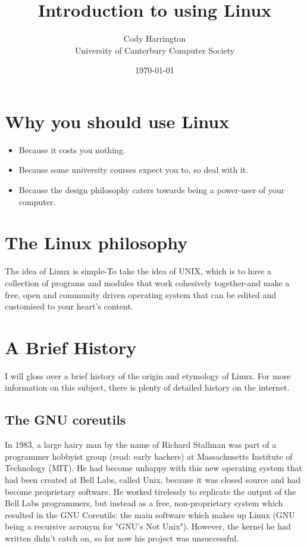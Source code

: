 \documentclass{article}
\begin{document}
\title{Introduction to using Linux}
\author{Cody Harrington\\University of Canterbury Computer Society}
\date{\today}
\maketitle

\section{Why you should use Linux}
\begin{itemize}
\item Because it costs you nothing.
\item Because some university courses expect you to, so deal with it.
\item Because the design philosophy caters towards being a power-user of your computer.
\end{itemize}

\section{The Linux philosophy}
The idea of Linux is simple-To take the idea of UNIX, which is to have a collection of programs and modules that work cohesively together-and make a free, open and community driven operating system that can be edited and customised to your heart's content.

\section{A Brief History}

I will gloss over a brief history of the origin and etymology of Linux. For more information on this subject, there is plenty of detailed history on the internet.

\subsection{The GNU coreutils}
In 1983, a large hairy man by the name of Richard Stallman was part of a programmer hobbyist group (read: early hackers) at Massachusetts Institute of Technology (MIT). He had become unhappy with this new operating system that had been created at Bell Labs, called Unix, because it was closed source and had become proprietary software. He worked tirelessly to replicate the output of the Bell Labs programmers, but instead as a free, non-proprietary system which resulted in the GNU Coreutils: the main software which makes up Linux (GNU being a recursive acronym for "GNU's Not Unix"). However, the kernel he had written didn't catch on, so for now his project was unsuccessful.
\end{document}
